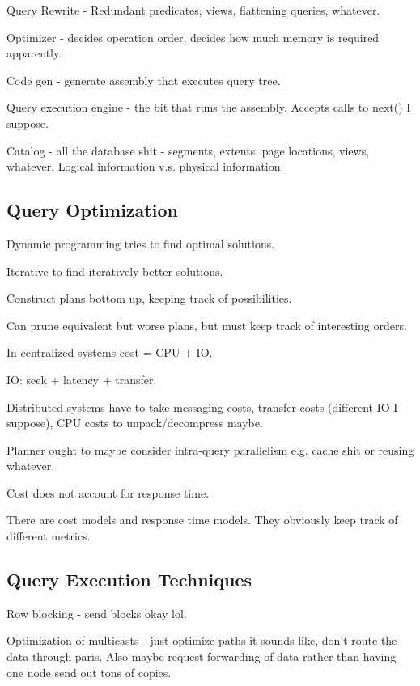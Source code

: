 \documentclass{article}
\begin{document}
		Query Rewrite - Redundant predicates, views, flattening queries, whatever.
		
		Optimizer - decides operation order, decides how much memory is required apparently.
		
		Code gen - generate assembly that executes query tree.
		
		Query execution engine - the bit that runs the assembly. Accepts calls to next() I suppose.
		
		Catalog - all the database shit - segments, extents, page locations, views, whatever. Logical information v.s. physical information
		
	\subsection{Query Optimization}
	
		Dynamic programming tries to find optimal solutions.
		
		Iterative to find iteratively better solutions.
		
		Construct plans bottom up, keeping track of possibilities.
		
		Can prune equivalent but worse plans, but must keep track of interesting orders.
		
		In centralized systems cost = CPU + IO.
		
		IO: seek + latency + transfer.
		
		Distributed systems have to take messaging costs, transfer costs (different IO I suppose), CPU costs to unpack/decompress maybe.
		
		Planner ought to maybe consider intra-query parallelism e.g. cache shit or reusing whatever.
		
		Cost does not account for response time.
		
		There are cost models and response time models. They obviously keep track of different metrics.
		
		
		
	\subsection{Query Execution Techniques}
	
		Row blocking - send blocks okay lol.
		
		Optimization of multicasts - just optimize paths it sounds like, don't route the data through paris. Also maybe request forwarding of data rather than having one node send out tons of copies.
		
\end{document}
